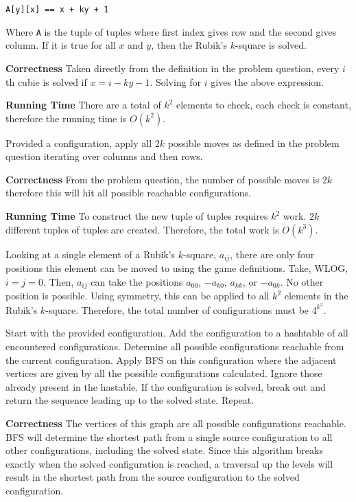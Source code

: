 \documentclass[12pt,twoside]{article}
\begin{document}
\begin{problems}
\begin{problemparts}
    {\tt A[y][x] == x + ky + 1}

    Where {\tt A} is the tuple of tuples where first index gives row and the
    second gives column. If it is true for all $x$ and $y$, then the Rubik's
    $k$-square is solved.

    {\bf Correctness} Taken directly from the definition in the problem
    question, every $i$th cubie is solved if $x = i - ky - 1$. Solving for
    $i$ gives the above expression.

    {\bf Running Time} There are a total of $k^2$ elements to check, each
    check is constant, therefore the running time is $O(k^2)$.

 Provided a configuration, apply all $2k$
    possible moves as defined in the problem question iterating over columns
    and then rows.

    {\bf Correctness} From the problem question, the number of possible moves
    is $2k$ therefore this will hit all possible reachable configurations.

    {\bf Running Time} To construct the new tuple of tuples requires $k^2$
    work. $2k$ different tuples of tuples are created. Therefore, the total
    work is $O(k^3)$.

\problempart Looking at a single element of a Rubik's $k$-square, $a_{ij}$,
    there are only four positions this element can be moved to using the game
    definitions. Take, WLOG, $i = j = 0$. Then, $a_{ij}$ can take the
    positions $a_{00}$, $-a_{k0}$, $a_{kk}$, or $-a_{0k}$. No other position
    is possible. Using symmetry, this can be applied to all $k^2$ elements in
    the Rubik's $k$-square. Therefore, the total number of configurations
    must be $4^{k^2}$.

 Start with the provided configuration. Add the
    configuration to a hashtable of all encountered configurations. Determine
    all possible configurations reachable from the current configuration.
    Apply BFS on this configuration where the adjacent vertices are given by
    all the possible configurations calculated. Ignore those already present
    in the hastable. If the configuration is solved, break out and return the 
    sequence leading up to the solved state. Repeat.

    {\bf Correctness} The vertices of this graph are all possible
    configurations reachable. BFS will determine the shortest path from a
    single source configuration to all other configurations, including the
    solved state. Since this algorithm breaks exactly when the solved
    configuration is reached, a traversal up the levels will result in the
    shortest path from the source configuration to the solved configuration.


\end{problemparts}
\end{problems}
\end{document}

